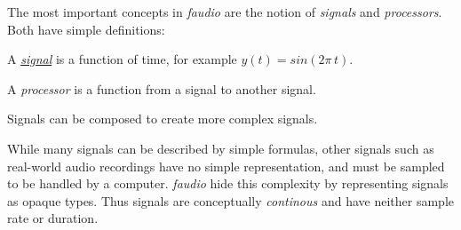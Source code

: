 \label{md__signals_Signals}%
\hypertarget{md__signals_Signals}{}%
\label{md__signals_Processors}%
\hypertarget{md__signals_Processors}{}%


The most important concepts in {\itshape faudio} are the notion of {\itshape signals} and {\itshape processors}. Both have simple definitions\-:


\begin{DoxyItemize}
\item A {\itshape \hyperlink{group___fa_signal_gac5c72f160cd6e93a6783551627b166e5}{signal}} is a function of time, for example $ y(t)=sin(2\pi\,t) $.
\end{DoxyItemize}


\begin{DoxyItemize}
\item A {\itshape processor} is a function from a signal to another signal.
\end{DoxyItemize}

Signals can be composed to create more complex signals.

While many signals can be described by simple formulas, other signals such as real-\/world audio recordings have no simple representation, and must be sampled to be handled by a computer. {\itshape faudio} hide this complexity by representing signals as opaque types. Thus signals are conceptually {\itshape continous} and have neither sample rate or duration. 